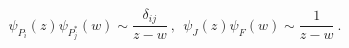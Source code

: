 \begin{equation}
 \psi_{P_i} (z) \psi_{P_j^*} (w) \sim \frac{\delta_{ij}}{z-w} ~,~~
 \psi_J (z) \psi_F (w) \sim \frac{1}{z-w} ~.
\end{equation}

